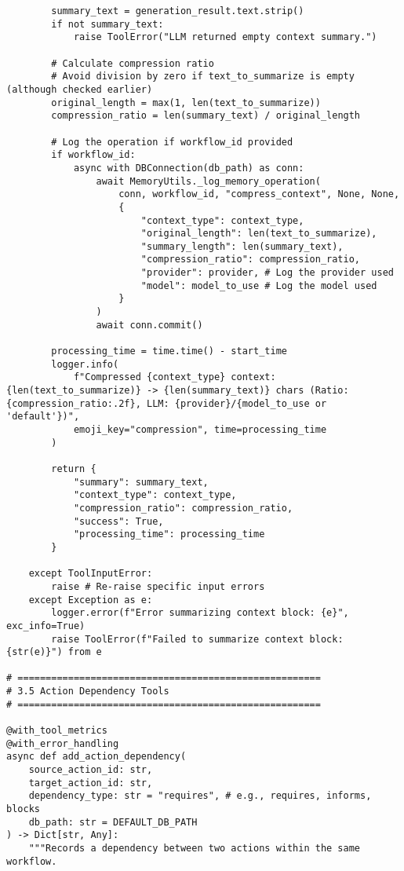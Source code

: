 \documentclass[12pt,a4paper]{article}
\begin{document}
\begin{pageablecode}
\begin{verbatim}
        summary_text = generation_result.text.strip()
        if not summary_text:
            raise ToolError("LLM returned empty context summary.")

        # Calculate compression ratio
        # Avoid division by zero if text_to_summarize is empty (although checked earlier)
        original_length = max(1, len(text_to_summarize))
        compression_ratio = len(summary_text) / original_length

        # Log the operation if workflow_id provided
        if workflow_id:
            async with DBConnection(db_path) as conn:
                await MemoryUtils._log_memory_operation(
                    conn, workflow_id, "compress_context", None, None,
                    {
                        "context_type": context_type,
                        "original_length": len(text_to_summarize),
                        "summary_length": len(summary_text),
                        "compression_ratio": compression_ratio,
                        "provider": provider, # Log the provider used
                        "model": model_to_use # Log the model used
                    }
                )
                await conn.commit()

        processing_time = time.time() - start_time
        logger.info(
            f"Compressed {context_type} context: {len(text_to_summarize)} -> {len(summary_text)} chars (Ratio: {compression_ratio:.2f}, LLM: {provider}/{model_to_use or 'default'})",
            emoji_key="compression", time=processing_time
        )

        return {
            "summary": summary_text,
            "context_type": context_type,
            "compression_ratio": compression_ratio,
            "success": True,
            "processing_time": processing_time
        }

    except ToolInputError:
        raise # Re-raise specific input errors
    except Exception as e:
        logger.error(f"Error summarizing context block: {e}", exc_info=True)
        raise ToolError(f"Failed to summarize context block: {str(e)}") from e
            
# ======================================================
# 3.5 Action Dependency Tools
# ======================================================

@with_tool_metrics
@with_error_handling
async def add_action_dependency(
    source_action_id: str,
    target_action_id: str,
    dependency_type: str = "requires", # e.g., requires, informs, blocks
    db_path: str = DEFAULT_DB_PATH
) -> Dict[str, Any]:
    """Records a dependency between two actions within the same workflow.


\end{verbatim}
\end{pageablecode}
\end{document}
